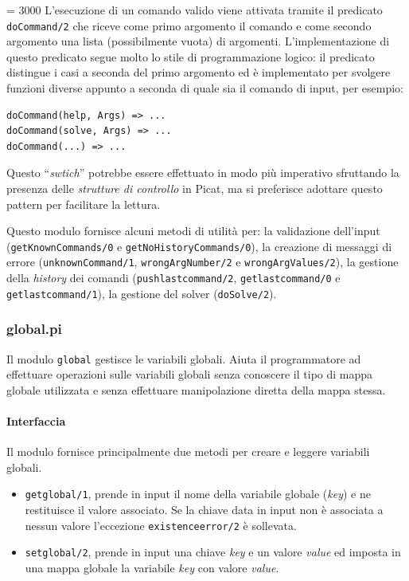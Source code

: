 \documentclass[12pt,a4paper,openright]{book}  %
\begin{document}
{\tolerance= 3000\relax
L'esecuzione di un comando valido viene attivata tramite il predicato
\texttt{doCommand/2} che riceve come primo argomento il comando e come
secondo argomento una lista (possibilmente vuota) di
argomenti. L'implementazione di questo predicato segue molto lo stile
di programmazione logico: il predicato distingue i casi a seconda del
primo argomento ed è implementato per svolgere funzioni diverse
appunto a seconda di quale sia il comando di input, per esempio:
\par}
\begin{verbatim}
doCommand(help, Args) => ...
doCommand(solve, Args) => ...
doCommand(...) => ...
\end{verbatim}
Questo ``\textit{swtich}'' potrebbe essere effettuato in modo più
imperativo sfruttando la presenza delle \textit{strutture di
  controllo} in Picat, ma si preferisce adottare questo pattern per
facilitare la lettura.

Questo modulo fornisce alcuni metodi di utilità per: la validazione
dell'input (\texttt{getKnownCommands/0} e
\texttt{getNoHistoryCommands/0}), la creazione di messaggi di errore
(\texttt{unknownCommand/1}, \texttt{wrongArgNumber/2} e
\texttt{wrongArgValues/2}), la gestione della \textit{history} dei
comandi (\texttt{push\textunderscore last\textunderscore command/2},
\texttt{get\textunderscore last\textunderscore command/0} e
\texttt{get\textunderscore last\textunderscore command/1}), la
gestione del solver (\texttt{doSolve/2}).

\subsubsection{global.pi}

Il modulo \texttt{global} gestisce le variabili globali. Aiuta il
programmatore ad effettuare operazioni sulle variabili globali senza
conoscere il tipo di mappa globale utilizzata e senza effettuare
manipolazione diretta della mappa stessa.

\paragraph{Interfaccia}
Il modulo fornisce principalmente due metodi per creare e leggere
variabili globali.

\begin{itemize}
	\item \texttt{get\textunderscore global/1}, prende in input il
          nome della variabile globale (\emph{key}) e ne restituisce
          il valore associato. Se la chiave data in input non è
          associata a nessun valore l'eccezione
          \texttt{existence\textunderscore error/2} è sollevata.
	\item \texttt{set\textunderscore global/2}, prende in input
          una chiave \emph{key} e un valore \emph{value} ed imposta in
          una mappa globale la variabile \emph{key} con valore
          \emph{value}.
\end{itemize}
\end{document}
